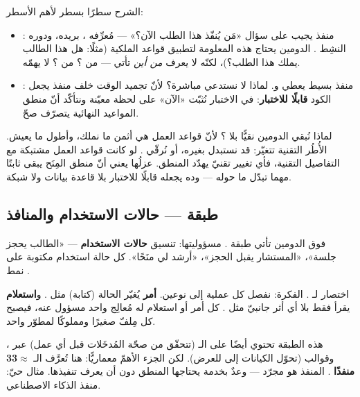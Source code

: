 الشرح سطرًا بسطر لأهم الأسطر:
\begin{itemize}
\item {}: منفذ يجيب على سؤال «مَن يُنفّذ هذا الطلب الآن؟» —
  مُعرِّفه ، بريده، ودوره النشِط . الدومين يحتاج هذه
  المعلومة لتطبيق قواعد الملكية (مثلًا: هل هذا الطالب يملك هذا الطلب؟)، لكنّه لا
  يعرف \emph{من أين} تأتي — من ؟ من ؟ لا يهمّه.
\item {}: منفذ بسيط يعطي  و. لماذا لا
  نستدعي  مباشرة؟ لأنّ تجميد الوقت خلف منفذ يجعل الكود
  \textbf{قابلًا للاختبار}: في الاختبار نُثبّت «الآن» على لحظة معيّنة ونتأكّد أنّ
  منطق المواعيد النهائية يتصرّف صحّ.
\end{itemize}

\begin{why}
لماذا نُبقي الدومين نقيًّا بلا ؟ لأنّ قواعد العمل هي أثمن ما نملك،
وأطول ما يعيش. الأُطُر التقنية  تتغيّر: قد نستبدل 
بغيره، أو نُرقّي . لو كانت قواعد العمل مشتبكة مع التفاصيل التقنية، فأي
تغيير تقنيّ يهدّد المنطق. عزلُها يعني أنّ منطق المِنَح يبقى ثابتًا مهما تبدّل ما
حوله — وده يجعله قابلًا للاختبار بلا قاعدة بيانات ولا شبكة.
\end{why}

\subsection{طبقة  — حالات الاستخدام والمنافذ}

فوق الدومين تأتي طبقة . مسؤوليتها: تنسيق \textbf{حالات الاستخدام}
 — «الطالب يحجز جلسة»، «المستشار يقبل الحجز»، «أرشد لي منَحًا». كل
حالة استخدام مكتوبة على نمط .

\begin{keyp}
 اختصار لـ . الفكرة: نفصل كل
عملية إلى نوعين. \textbf{أمر}  يُغيّر الحالة (كتابة) مثل
. و\textbf{استعلام}  يقرأ فقط بلا أي أثر
جانبيّ مثل . كل أمر أو استعلام له مُعالِج
 واحد مسؤول عنه، فيصبح كل مِلفّ صغيرًا ومملوكًا لمطوّر واحد.
\end{keyp}

هذه الطبقة تحتوي أيضًا على الـ  (تتحقّق من صحّة المُدخَلات قبل أي
عمل) عبر ، وقوالب  (تحوّل الكيانات إلى
 للعرض). لكن الجزء الأهمّ معماريًّا: هنا تُعرَّف الـ \textbf{$\approx$33
منفذًا} . المنفذ هو مجرّد  — وعدٌ بخدمة يحتاجها المنطق دون
أن يعرف تنفيذها. مثال حيّ: منفذ الذكاء الاصطناعي.

